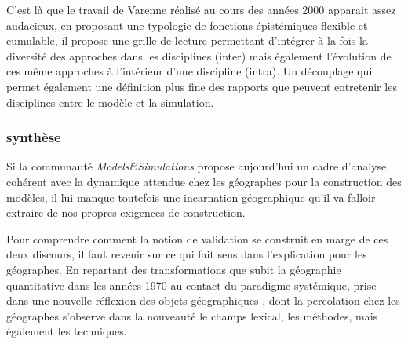


C'est là que le travail de Varenne réalisé au cours des années 2000 \autocites{Varenne2008, Varenne2013} apparait assez audacieux, en proposant une typologie de fonctions épistémiques flexible et cumulable, il propose une grille de lecture permettant d'intégrer à la fois la diversité des approches dans les disciplines (inter) mais également l'évolution de ces même approches à l'intérieur d'une discipline (intra). Un découplage qui permet également une définition plus fine des rapports que peuvent entretenir les disciplines entre le modèle et la simulation.






\subsubsection{synthèse}

Si la communauté \textit{Models\&Simulations} propose aujourd'hui un cadre d'analyse cohérent avec la dynamique attendue chez les géographes pour la construction des modèles, il lui manque toutefois une incarnation géographique qu'il va falloir extraire de nos propres exigences de construction.

Pour comprendre comment la notion de validation se construit en marge de ces deux discours, il faut revenir sur ce qui fait sens dans l'explication pour les géographes. En repartant des transformations que subit la géographie quantitative dans les années 1970 au contact du paradigme systémique, prise dans une nouvelle réflexion des objets géographiques , dont la percolation chez les géographes s'observe dans la nouveauté le champs lexical, les méthodes, mais également les techniques.

